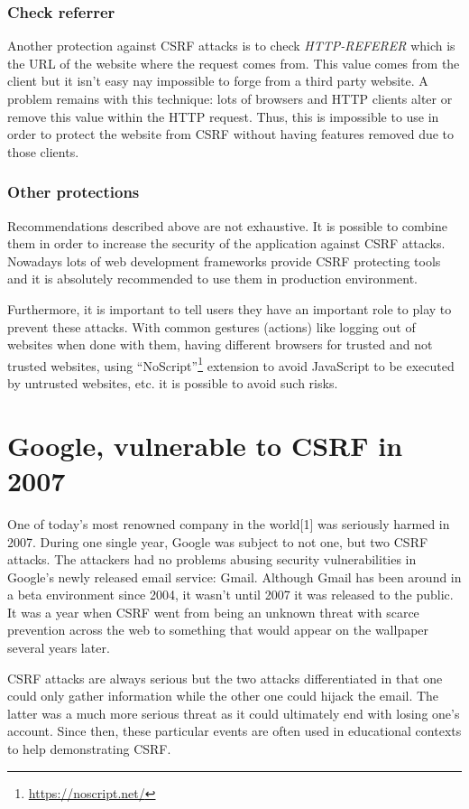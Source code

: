 \documentclass[a4paper,11pt,openany]{report}
\begin{document}
  \subsubsection{Check referrer}
  Another protection against CSRF attacks is to check \textit{HTTP-REFERER} which is the URL of the 
  website where the request comes from. This value comes from the client but it isn't easy nay impossible 
  to forge from a third party website. A problem remains with this technique: lots of browsers and HTTP 
  clients alter or remove this value within the HTTP request. Thus, this is impossible to use in order 
  to protect the website from CSRF without having features removed due to those clients.
   
  \subsubsection{Other protections}  
  Recommendations described above are not exhaustive. It is possible to combine them in order to increase 
  the security of the application against CSRF attacks. Nowadays lots of web development frameworks provide 
  CSRF protecting tools and it is absolutely recommended to use them in production environment.
  
  Furthermore, it is important to tell users they have an important role to play to prevent these attacks. 
  With common gestures (actions) like logging out of websites when done with them, having different browsers 
  for trusted and not trusted websites, using ``NoScript''\footnote{\url{https://noscript.net/}} extension to 
  avoid JavaScript to be executed by untrusted websites, etc. it is possible to avoid such risks.
  
  \section{Google, vulnerable to CSRF in 2007}
  One of today's most renowned company in the world[1] was seriously harmed in 2007. During one single year, 
  Google was subject to not one, but two CSRF attacks. The attackers had no problems abusing security 
  vulnerabilities in Google's newly released email service: Gmail. Although Gmail has been around in a beta 
  environment since 2004, it wasn't until 2007 it was released to the public. It was a year when CSRF went from 
  being an unknown threat with scarce prevention across the web to something that would appear on the wallpaper 
  several years later.
  
  CSRF attacks are always serious but the two attacks differentiated in that one could only gather information 
  while the other one could hijack the email. The latter was a much more serious threat as it could ultimately end 
  with losing one's account. Since then, these particular events are often used in educational contexts to help 
  demonstrating CSRF. 
\end{document}
